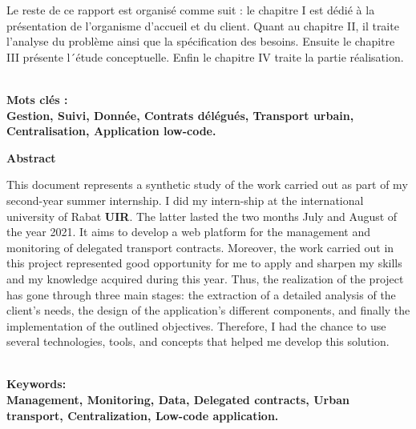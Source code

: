 \documentclass[a4paper]{report}
\begin{document}
\begin{doublespace}
	Le reste de ce rapport est organisé comme suit : le chapitre I est dédié à
	la présentation de
	l’organisme d’accueil et du client. Quant au chapitre II, il traite
	l’analyse du problème ainsi que la spécification des besoins. Ensuite le
	chapitre III présente l´étude conceptuelle. Enfin le chapitre IV traite la
	partie réalisation.

	\textbf	{\\Mots clés :\\ Gestion, Suivi, Donnée, Contrats délégués,
		Transport urbain, Centralisation, Application low-code.}

	\clearpage
		\begin{center}
			\vspace*{1cm}
			\textbf{\huge{Abstract}}
		\end{center}
		\renewcommand{\headrulewidth}{1pt}
		\fancyhead[L]{\hspace*{5cm}}

	This document represents a synthetic study of the work carried out as part
	of my second-year summer internship.
	I did my intern-ship at the international university of Rabat \textbf{UIR}.
	The latter lasted the two months
	July and August of the year 2021. It aims to develop a web platform for the
	management and monitoring of
	delegated transport contracts. Moreover, the work carried out in this
	project represented good opportunity
	for me to apply and sharpen my skills and my knowledge acquired during this
	year. Thus, the realization
	of the project has gone through three main stages: the extraction of a
	detailed analysis of the client's
	needs, the design of the application's different components, and finally
	the implementation of the outlined objectives.
	Therefore, I had the chance to use several technologies, tools, and
	concepts that helped me develop this solution.

	\textbf{\\Keywords:\\Management, Monitoring, Data, Delegated contracts,
		Urban transport, Centralization, Low-code application.}

\end{doublespace}

\newpage
\renewcommand{\headrulewidth}{1pt}
\fancyhead[L]{\hspace*{5cm}}
\tableofcontents

\cleardoublepage
\listoffigures
\end{document}
